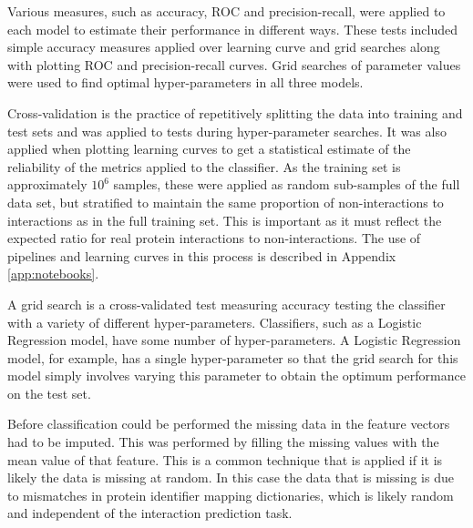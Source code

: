 %  

Various measures, such as accuracy, \ac{ROC} and precision-recall, were applied to each model to estimate their performance in different ways.
These tests included simple accuracy measures applied over learning curve and grid searches along with plotting \ac{ROC} and precision-recall curves.
Grid searches of parameter values were used to find optimal hyper-parameters in all three models.

Cross-validation is the practice of repetitively splitting the data into training and test sets and was applied to tests during hyper-parameter searches\autocite[152]{witten_data_2011}.
It was also applied when plotting learning curves to get a statistical estimate of the reliability of the metrics applied to the classifier.
As the training set is approximately $10^{6}$ samples, these were applied as random sub-samples of the full data set, but stratified to maintain the same proportion of non-interactions to interactions as in the full training set.
This is important as it must reflect the expected ratio for real protein interactions to non-interactions.
The use of pipelines and learning curves in this process is described in Appendix \ref{app:notebooks}.

A grid search is a cross-validated test measuring accuracy testing the classifier with a variety of different hyper-parameters.
Classifiers, such as a Logistic Regression model, have some number of hyper-parameters.
A Logistic Regression model, for example, has a single hyper-parameter so that the grid search for this model simply involves varying this parameter to obtain the optimum performance on the test set.

Before classification could be performed the missing data in the feature vectors had to be imputed.
This was performed by filling the missing values with the mean value of that feature.
This is a common technique that is applied if it is likely the data is missing at random.
In this case the data that is missing is due to mismatches in protein identifier mapping dictionaries, which is likely random and independent of the interaction prediction task.

